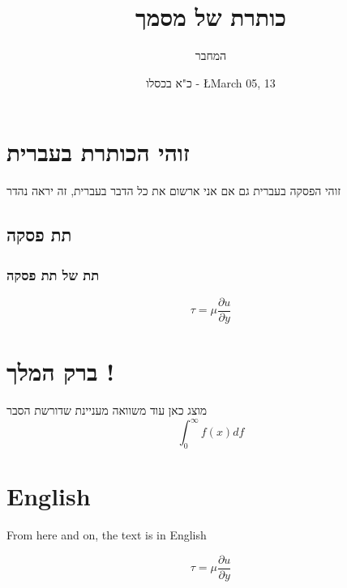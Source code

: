 \documentclass{article}
\title{כותרת של מסמך}
\author{המחבר}
\date{כ"א בכסלו - \L{March 05, 13}}
\begin{document}
\maketitle



\section{זוהי הכותרת בעברית}
זוהי הפסקה בעברית
גם אם אני ארשום את כל הדבר בעברית, זה יראה נהדר

\subsection{תת פסקה}
\subsubsection{תת של תת פסקה}


\begin{equation}\label{eq:visc}
\tau = \mu \frac{\partial u}{\partial y}
\end{equation}

\section{ברק המלך !}
מוצג כאן עוד משוואה מעניינת שדורשת הסבר
\begin{equation}
  \int_{0}^{\infty} f(x) df
\end{equation}

\section{English}

From here and on, the text is in English

\begin{equation}\label{eq:visc}
\tau = \mu \frac{\partial u}{\partial y}
\end{equation}
\end{document}
